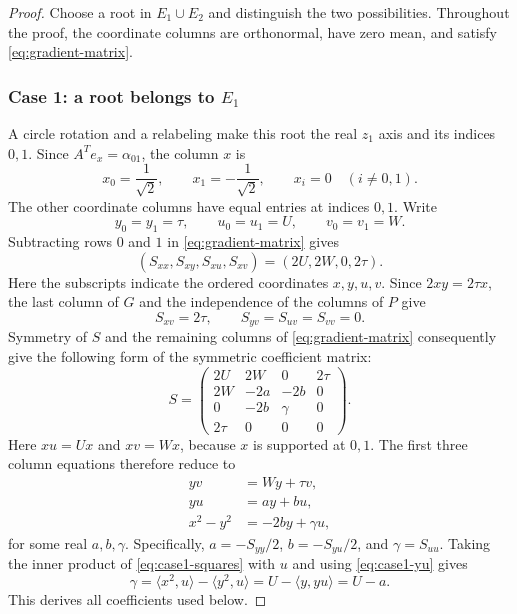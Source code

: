 \documentclass[11pt,reqno]{amsart}
\theoremstyle{definition}
\theoremstyle{remark}
\numberwithin{equation}{section}
\newcommand{\ip}[2]{\langle #1,#2\rangle}
\begin{document}
\begin{proof}
Choose a root in $E_1\cup E_2$ and distinguish the two possibilities.
Throughout the proof, the coordinate columns are orthonormal,
have zero mean, and satisfy \eqref{eq:gradient-matrix}.

\subsubsection*{Case 1: a root belongs to $E_1$}
A circle rotation and a relabeling make this root the real $z_1$
axis and its indices $0,1$. Since $A^Te_x=\alpha_{01}$, the
column $x$ is
\[
 x_0=\frac1{\sqrt2},\qquad x_1=-\frac1{\sqrt2},\qquad
 x_i=0\quad(i\ne0,1).
\]
The other coordinate columns have equal entries at indices $0,1$.
Write
\[
 y_0=y_1=\tau,\qquad u_0=u_1=U,\qquad v_0=v_1=W.
\]
Subtracting rows $0$ and $1$ in \eqref{eq:gradient-matrix} gives
\begin{equation}\label{eq:case1-first-row}
 (S_{xx},S_{xy},S_{xu},S_{xv})=(2U,2W,0,2\tau).
\end{equation}
Here the subscripts indicate the ordered coordinates $x,y,u,v$.
Since $2xy=2\tau x$, the last column of $G$ and the independence
of the columns of $P$ give
\[
 S_{xv}=2\tau,\qquad S_{yv}=S_{uv}=S_{vv}=0.
\]
Symmetry of $S$ and the remaining columns of
\eqref{eq:gradient-matrix} consequently give the following form of the symmetric coefficient matrix:
\[
 S=\begin{pmatrix}
  2U&2W&0&2\tau\\
  2W&-2a&-2b&0\\
  0&-2b&\gamma&0\\
  2\tau&0&0&0
 \end{pmatrix}.
\]
Here $xu=Ux$ and $xv=Wx$, because $x$ is supported at $0,1$.
The first three column equations therefore reduce to
\begin{align}
 yv&=Wy+\tau v,\label{eq:case1-yv}\\
 yu&=a y+b u,\label{eq:case1-yu}\\
 x^2-y^2&=-2b y+\gamma u,\label{eq:case1-squares}
\end{align}
for some real $a,b,\gamma$. Specifically,
$a=-S_{yy}/2$, $b=-S_{yu}/2$, and $\gamma=S_{uu}$.
Taking the inner product of \eqref{eq:case1-squares} with $u$
and using \eqref{eq:case1-yu} gives
\begin{equation}\label{eq:case1-gamma}
 \gamma=\ip{x^2}{u}-\ip{y^2}{u}
        =U-\ip{y}{yu}=U-a.
\end{equation}
This derives all coefficients used below.


\end{proof}
\end{document}
